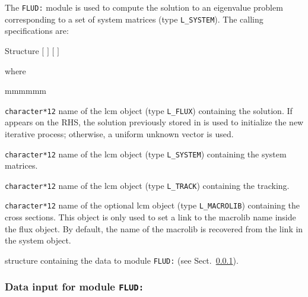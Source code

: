The {\tt FLUD:} module is used to compute the solution to an eigenvalue problem corresponding to a set of system matrices (type {\tt L\_SYSTEM}). The calling specifications are:

\begin{DataStructure}{Structure }
 \moc{:=}  $[$  $]$   $[$  $]$ \moc{::} 
\end{DataStructure}

\noindent where
\begin{ListeDeDescription}{mmmmmm}

\item[\dusa{FLUX}] {\tt character*12} name of the {\sc lcm} object (type {\tt L\_FLUX}) containing the solution. If  appears on the RHS, the solution previously stored in  is used to initialize the new iterative process; otherwise, a uniform unknown vector is used.

\item[\dusa{SYST}] {\tt character*12} name of the {\sc lcm} object (type {\tt L\_SYSTEM}) containing the system matrices.

\item[\dusa{TRACK}] {\tt character*12} name of the {\sc lcm} object (type {\tt L\_TRACK}) containing the {\sc tracking}.

\item[\dusa{MACRO}] {\tt character*12} name of the optional {\sc lcm} object (type {\tt L\_MACROLIB}) containing the cross sections. This
object is only used to set a link to the {\sc macrolib} name inside the {\sc flux} object. By default, the name of the {\sc macrolib} is recovered
from the link in the {\sc system} object.

\item[\dstr{flud\_data}] structure containing the data to module {\tt FLUD:} (see Sect.~\ref{sect:fld_data}).

\end{ListeDeDescription}

\vskip 0.2cm

\subsubsection{Data input for module {\tt FLUD:}}\label{sect:fld_data}

